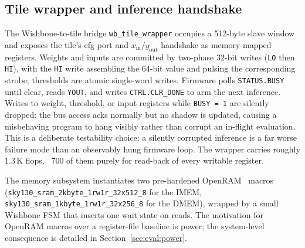 \documentclass[conference]{IEEEtran}
\begin{document}
\subsection{Tile wrapper and inference handshake}
\label{sec:arch:wrapper}

The Wishbone-to-tile bridge \texttt{wb\_tile\_wrapper} occupies a
512-byte slave window and exposes the tile's cfg port and
\(x_\text{in}/y_\text{out}\) handshake as memory-mapped registers.
Weights and inputs are committed by two-phase 32-bit writes
(\texttt{LO} then \texttt{HI}), with the \texttt{HI} write
assembling the 64-bit value and pulsing the corresponding strobe;
thresholds are atomic single-word writes. Firmware polls
\texttt{STATUS.BUSY} until clear, reads \texttt{YOUT}, and writes
\texttt{CTRL.CLR\_DONE} to arm the next inference. Writes to
weight, threshold, or input registers while \texttt{BUSY\,=\,1}
are silently dropped: the bus access acks normally but no shadow
is updated, causing a misbehaving program to hang visibly rather
than corrupt an in-flight evaluation. This is a deliberate
testability choice: a silently corrupted inference is a far worse
failure mode than an observably hung firmware loop. The wrapper
carries roughly 1.3\,K flops, ~700 of them purely for read-back of
every writable register.

The memory subsystem instantiates two pre-hardened
OpenRAM~\cite{openram} macros
(\texttt{sky130\_sram\_2kbyte\_1rw1r\_32x512\_8} for the IMEM,
\texttt{sky130\_sram\_1kbyte\_1rw1r\_32x256\_8} for the DMEM),
wrapped by a small Wishbone FSM that inserts one wait state on
reads. The motivation for OpenRAM macros over a register-file
baseline is power; the system-level consequence is detailed in
Section~\ref{sec:eval:power}.

\end{document}
